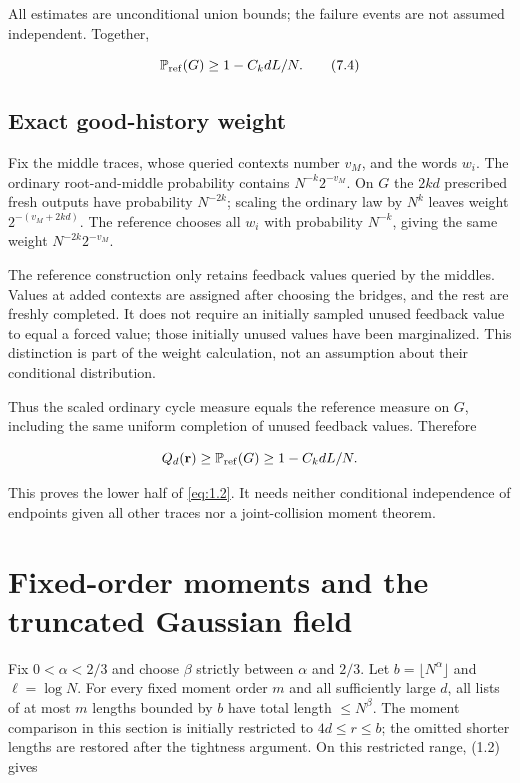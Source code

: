 \documentclass[11pt]{article}
\theoremstyle{remark}
\begin{document}
All estimates are unconditional union bounds; the failure events are not
assumed independent. Together,

\[
 \mathbb P_{\rm ref}(G)\ge1-C_k dL/N.
 \tag{7.4}\label{eq:7.4}
\]

\subsection{Exact good-history weight}\label{exact-good-history-weight}

Fix the middle traces, whose queried contexts number \(v_M\), and the
words \(w_i\). The ordinary root-and-middle probability contains
\(N^{-k}2^{-v_M}\). On \(G\) the \(2kd\) prescribed fresh outputs have
probability \(N^{-2k}\); scaling the ordinary law by \(N^k\) leaves
weight \(2^{-(v_M+2kd)}\). The reference chooses all \(w_i\) with
probability \(N^{-k}\), giving the same weight \(N^{-2k}2^{-v_M}\).

The reference construction only retains feedback values queried by the
middles. Values at added contexts are assigned after choosing the
bridges, and the rest are freshly completed. It does not require an
initially sampled unused feedback value to equal a forced value; those
initially unused values have been marginalized. This distinction is part
of the weight calculation, not an assumption about their conditional
distribution.

Thus the scaled ordinary cycle measure equals the reference measure on
\(G\), including the same uniform completion of unused feedback values.
Therefore

\[
 Q_d(\mathbf r)\ge\mathbb P_{\rm ref}(G)\ge1-C_kdL/N.
\]

This proves the lower half of \eqref{eq:1.2}. It needs neither conditional
independence of endpoints given all other traces nor a joint-collision
moment theorem.

\section{Fixed-order moments and the truncated Gaussian
field}\label{fixed-order-moments-and-the-truncated-gaussian-field}

Fix \(0<\alpha<2/3\) and choose \(\beta\) strictly between \(\alpha\)
and \(2/3\). Let \(b=\lfloor N^\alpha\rfloor\) and \(\ell=\log N\). For
every fixed moment order \(m\) and all sufficiently large \(d\), all
lists of at most \(m\) lengths bounded by \(b\) have total length
\(\le N^\beta\). The moment comparison in this section is initially
restricted to \(4d\le r\le b\); the omitted shorter lengths are restored
after the tightness argument. On this restricted range, (1.2) gives
\end{document}

